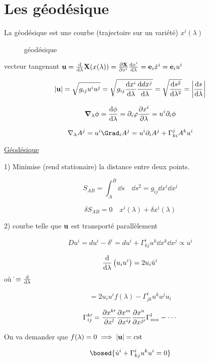 \section*{Les géodésique}

La géodésique est une courbe (trajectoire sur un variété) $x^i(\lambda)$ 

\begin{figure}[ht]
    \centering
    \caption{géodésique}
    \label{fig:géodésique}
\end{figure}

vecteur tangenant $\vb{u} = \dv{{}}{\lambda} \vb{X}(x(\lambda)) = \pdv{\vb{X}}{x^i} \dv{x^{i}}{\lambda} = \vb{e}_i \dot x^{i}= \vb{e}_i u^i $ 

$$\abs{\vb{u}} = \sqrt{g_{ij}  u^{i}u^{j}} = \sqrt{g_{ij} \dv{x^{i}}{\lambda} \dv{dx^{j}}{\lambda} } = \sqrt{\dv{s^{2}} {\lambda^{2} }} = \abs{ \dv{s}{\lambda}  }  $$ 

$$\grad_{\lambda} \phi = \dv{\phi}{\lambda} = \partial_i \varphi \pdv{x^{i}}{\lambda} = u^{i}\partial_i \phi$$ 


$$\nabla_{\lambda} A^j = u^{i}\Grad_i A^{j} = u^{i}\partial_i A^{j} + \Gamma_{ki}^{j}A^{k}u^i$$ 



\underline{Géodésique} 

1) Minimise (rend stationaire) la distance entre deux points.

$$S_{AB} = \int_{A}^{B}\dd s \quad \dd s^{2}= g_{ij} \dd x^{i} \dd x^{j}$$ 

$$\delta S_{AB} = 0 \quad x^{i}(\lambda)+ \delta x^{i}(\lambda)$$ 

2) courbe telle que $\vb{u}$ est transporté parallèlement

$$Du^{i}= du^{i}- \delta^{i}= du^{i} + \Gamma_{kj}^{i}u^{k} \dd  x^{k} \dd  x^{j}\propto u^i$$ 

$$\dv{{}}{\lambda} \left( u_i u^i \right) = 2u_i \dot u^{i}$$ 
où $\dot{} \equiv \dv{{}}{\lambda} $ 

$$=2u_i u^{i}f(\lambda) - \Gamma_{jk}^{i}u^{k}u^{j}u_i $$ 


\begin{tcolorbox}[title=]
    $$\Gamma_{ij}^{k\prime} = \pdv{x^{k\prime}}{x^l} \pdv{x^{m}}{x^i\prime} \pdv{x^{n}}{x^{j\prime}} \Gamma_{mn}^{l} - \dotsb$$  
\end{tcolorbox}

On va demander que $f(\lambda) =0 \implies \abs{\vb{u}} = \text{cst}  $ 

$$\bosed{\dot u^{i} + \Gamma_{kj}^{i}u^{k}u^{i}= 0}$$ 


